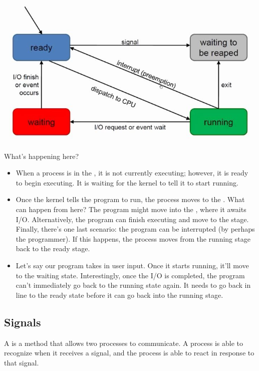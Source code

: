 \begin{center}
\includegraphics[width=\textwidth]{july10/pls}
\end{center}

What's happening here? \begin{itemize}
    \item When a process is in the , it is not currently executing; however, it is ready to begin executing. It is waiting for the kernel to tell it to start running.
    \item Once the kernel tells the program to run, the process moves to the . What can happen from here? The program might move into the , where it awaits I/O. Alternatively, the program can finish executing and move to the  stage. Finally, there's one last scenario: the program can be interrupted (by perhaps the programmer). If this happens, the process moves from the running stage back to the ready stage.
    \item Let's say our program takes in user input. Once it starts running, it'll move to the waiting state. Interestingly, once the I/O is completed, the program can't immediately go back to the running state again. It needs to go back in line to the ready state before it can go back into the running stage. 
\end{itemize}



\subsection{Signals}

A  is a method that allows two processes to communicate. A process is able to recognize when it receives a signal, and the process is able to react in response to that signal. 

